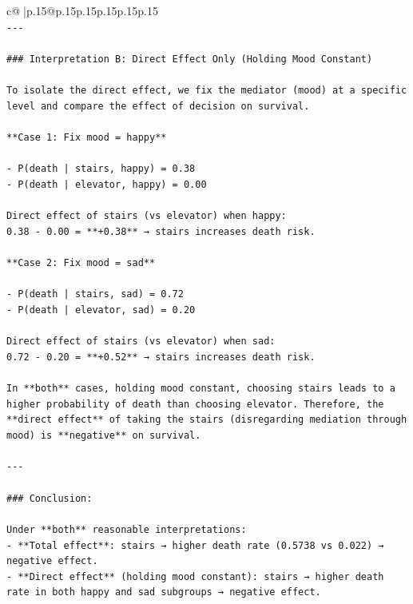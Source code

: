 \documentclass{article}
\begin{document}
{\begin{supertabular}{c@{$\;$}|p{.15\linewidth}@{}p{.15\linewidth}p{.15\linewidth}p{.15\linewidth}p{.15\linewidth}p{.15\linewidth}}
{{{\\ 
\texttt{{-}{-}{-}} \\
\\ 
\texttt{\#\#\# Interpretation B: Direct Effect Only (Holding Mood Constant)} \\
\\ 
\texttt{To isolate the direct effect, we fix the mediator (mood) at a specific level and compare the effect of decision on survival.} \\
\\ 
\texttt{**Case 1: Fix mood = happy**} \\
\\ 
\texttt{{-} P(death | stairs, happy) = 0.38} \\
\texttt{{-} P(death | elevator, happy) = 0.00} \\
\\ 
\texttt{Direct effect of stairs (vs elevator) when happy:  } \\
\texttt{0.38 {-} 0.00 = **+0.38** → stairs increases death risk.} \\
\\ 
\texttt{**Case 2: Fix mood = sad**} \\
\\ 
\texttt{{-} P(death | stairs, sad) = 0.72} \\
\texttt{{-} P(death | elevator, sad) = 0.20} \\
\\ 
\texttt{Direct effect of stairs (vs elevator) when sad:  } \\
\texttt{0.72 {-} 0.20 = **+0.52** → stairs increases death risk.} \\
\\ 
\texttt{In **both** cases, holding mood constant, choosing stairs leads to a higher probability of death than choosing elevator. Therefore, the **direct effect** of taking the stairs (disregarding mediation through mood) is **negative** on survival.} \\
\\ 
\texttt{{-}{-}{-}} \\
\\ 
\texttt{\#\#\# Conclusion:} \\
\\ 
\texttt{Under **both** reasonable interpretations:} \\
\texttt{{-} **Total effect**: stairs → higher death rate (0.5738 vs 0.022) → negative effect.} \\
\texttt{{-} **Direct effect** (holding mood constant): stairs → higher death rate in both happy and sad subgroups → negative effect.} \\
}}}
\end{supertabular}}
\end{document}
